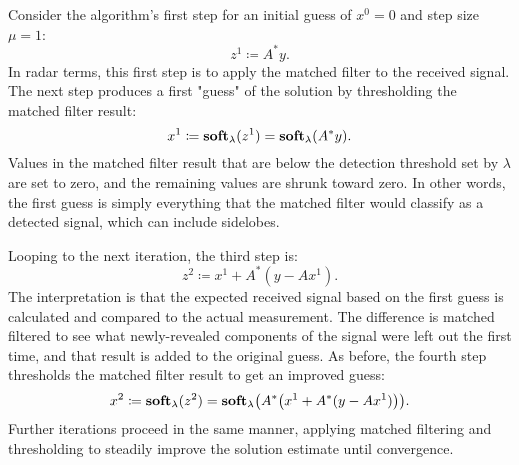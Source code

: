Consider the algorithm's first step for an initial guess of $x^0 = 0$ and step size $\mu = 1$:
\begin{equation}
 z^1 \coloneqq A^*y.
\end{equation}
In radar terms, this first step is to apply the matched filter to the received signal. The next step produces a first "guess" of the solution by thresholding the matched filter result:
\begin{equation}
 x^1 \coloneqq \operatorname{\mathbf{soft}}_{\lambda}(z^1) = \operatorname{\mathbf{soft}}_{\lambda}(A^*y).
\end{equation}
Values in the matched filter result that are below the detection threshold set by $\lambda$ are set to zero, and the remaining values are shrunk toward zero. In other words, the first guess is simply everything that the matched filter would classify as a detected signal, which can include sidelobes.

Looping to the next iteration, the third step is:
\begin{equation}
 z^2 \coloneqq x^1 + A^*(y - Ax^1).
\end{equation}
The interpretation is that the expected received signal based on the first guess is calculated and compared to the actual measurement. The difference is matched filtered to see what newly-revealed components of the signal were left out the first time, and that result is added to the original guess. As before, the fourth step thresholds the matched filter result to get an improved guess:
\begin{equation}
 x^2 \coloneqq \soft_{\lambda}(z^2) = \soft_{\lambda}\paren*{A^*\paren*{x^1 + A^*(y - Ax^1)}}.
\end{equation}
Further iterations proceed in the same manner, applying matched filtering and thresholding to steadily improve the solution estimate until convergence.

